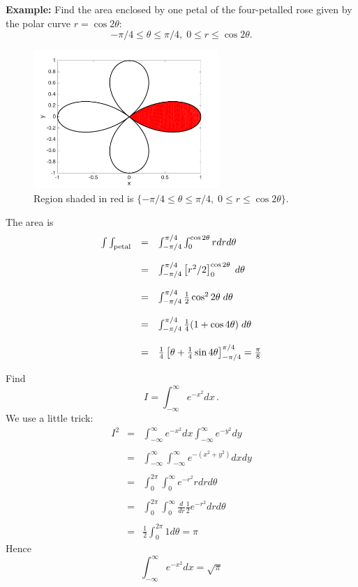 \documentclass{article}
\begin{document}
\textbf{Example:}  Find the area enclosed by one petal of the
four-petalled rose given by the polar curve $r=\cos 2 \theta$:
$$
-\pi/4 \le \theta \le \pi/4, \; 0 \le r \le \cos 2 \theta.
$$
\begin{figure}[!ht]
\vspace{-.5cm}
\centering
\includegraphics[width = 7cm]{rose.pdf}%
\caption{Region shaded in red is $\lbrace -\pi/4 \le \theta \le \pi/4, \; 0 \le r \le \cos 2 \theta \rbrace$.}
\label{rose}
\end{figure}


The area is
$$
\begin{array}{lll}
\int \int_{\rm petal} & = & \int_{-\pi/4}^{\pi/4} \int_0^{\cos 2
\theta} r dr d \theta \\
\\
 & = & \int_{-\pi/4}^{\pi/4} \left[ r^2/2
\right]_0^{\cos 2 \theta} \; d \theta \\
\\
 & = & \int_{-\pi/4}^{\pi/4}  \frac{1}{2} \cos^2 2\theta \; d \theta\\
 \\
  & = & \int_{-\pi/4}^{\pi/4}  \frac{1}{4} (1+\cos 4 \theta) \; d \theta\\
  \\
   & = & \frac{1}{4} \left[\theta+  \frac{1}{4} \sin 4 \theta \right]_{-\pi/4}^{\pi/4}=
\frac{\pi}{8}
\end{array}
$$


Find
$$
I = \int_{-\infty}^{\infty} e^{-x^2} dx\,.
$$
We use a little trick:
$$
\begin{array}{lll}
I^2 & = & \int_{-\infty}^{\infty} e^{-x^2} dx \int_{-\infty}^{\infty} e^{-y^2} dy\\
\\
& = & \int_{-\infty}^{\infty} \int_{-\infty}^{\infty} e^{-(x^2 + y^2)} dx dy\\
\\
 & = & \int_0^{2\pi} \int_0^\infty e^{-r^2} r dr d \theta\\
 \\
 & = & \int_0^{2\pi} \int_0^\infty \frac{d}{dr} \frac{1}{2} e^{-r^2} dr d \theta\\
 \\
 & = & \frac{1}{2} \int_0^{2\pi} 1 d \theta = \pi
 \end{array}
$$
Hence
$$
\int_{-\infty}^{\infty} e^{-x^2} dx = \sqrt{\pi}
$$
\end{document}
